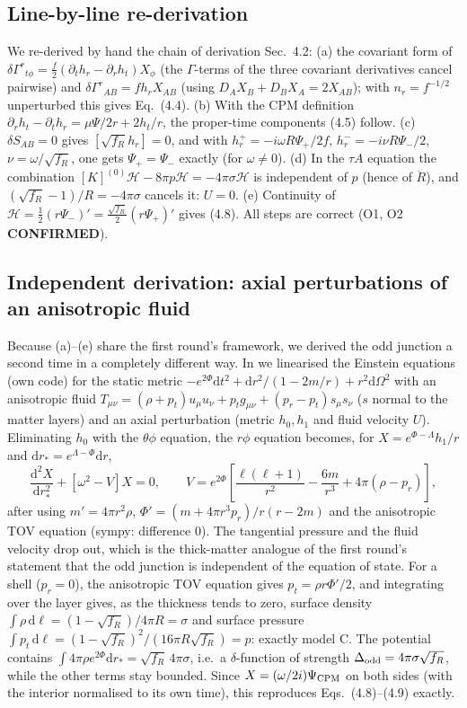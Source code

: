 \documentclass[11pt,a4paper]{article}
\newcommand{\sq}{\sqrt{f_R}}
\newcommand{\dd}{\mathrm{d}}
\newcommand{\OK}{\textcolor{green!50!black}{\textbf{CONFIRMED}}}
\newcommand{\file}[1]{{\small\path{#1}}}
\begin{document}
\subsection{Line-by-line re-derivation}
We re-derived by hand the chain of derivation Sec.~4.2: (a) the covariant form of
$\delta\Gamma^r{}_{t\phi}=\tfrac f2(\partial_th_r-\partial_rh_t)X_\phi$ (the $\Gamma$-terms of the three covariant
derivatives cancel pairwise) and $\delta\Gamma^r{}_{AB}=fh_rX_{AB}$ (using $D_AX_B+D_BX_A=2X_{AB}$); with $n_r=f^{-1/2}$
unperturbed this gives Eq.~(4.4). (b) With the CPM definition $\partial_rh_t-\partial_th_r=\mu\Psi/2r+2h_t/r$, the
proper-time components (4.5) follow. (c) $\delta S_{AB}=0$ gives $[\sq h_r]=0$, and with
$h_r^+=-i\omega R\Psi_+/2f$, $h_r^-=-i\nu R\Psi_-/2$, $\nu=\omega/\sq$, one gets $\Psi_+=\Psi_-$ exactly (for
$\omega\ne0$). (d) In the $\tau A$ equation the combination $[K]^{(0)}\mathcal H-8\pi p\mathcal H=-4\pi\sigma\mathcal H$
is independent of $p$ (hence of $\ddot R$), and $(\sq-1)/R=-4\pi\sigma$ cancels it: $U=0$. (e) Continuity of
$\mathcal H=\tfrac12(r\Psi_-)'=\tfrac{\sq}{2}(r\Psi_+)'$ gives (4.8). All steps are correct (O1, O2 \OK).

\subsection{Independent derivation: axial perturbations of an anisotropic fluid}
Because (a)--(e) share the first round's framework, we derived the odd junction a second time in a completely
different way. In \file{c03_axial_thick_shell_derive.py} we linearised the Einstein equations (own code) for the
static metric $-e^{2\Phi}\dd t^2+\dd r^2/(1-2m/r)+r^2\dd\Omega^2$ with an anisotropic fluid
$T_{\mu\nu}=(\rho+p_t)u_\mu u_\nu+p_tg_{\mu\nu}+(p_r-p_t)s_\mu s_\nu$ ($s$ normal to the matter layers) and an axial
perturbation (metric $h_0,h_1$ and fluid velocity $U$). Eliminating $h_0$ with the $\theta\phi$ equation, the
$r\phi$ equation becomes, for $X=e^{\Phi-\Lambda}h_1/r$ and $\dd r_*=e^{\Lambda-\Phi}\dd r$,
\begin{equation}
\frac{\dd^2X}{\dd r_*^2}+\left[\omega^2-V\right]X=0,\qquad V=e^{2\Phi}\left[\frac{\ell(\ell+1)}{r^2}-\frac{6m}{r^3}+4\pi(\rho-p_r)\right],
\end{equation}
after using $m'=4\pi r^2\rho$, $\Phi'=(m+4\pi r^3p_r)/r(r-2m)$ and the anisotropic TOV equation (sympy: difference 0).
The tangential pressure and the fluid velocity drop out, which is the thick-matter analogue of the first round's
statement that the odd junction is independent of the equation of state. For a shell ($p_r=0$), the
anisotropic TOV equation gives $p_t=\rho r\Phi'/2$, and integrating over the layer gives, as the thickness tends to
zero, surface density $\int\rho\,\dd\ell=(1-\sq)/4\pi R=\sigma$ and surface pressure
$\int p_t\,\dd\ell=(1-\sq)^2/(16\pi R\sq)=p$: exactly model C. The potential contains
$\int4\pi\rho e^{2\Phi}\dd r_*=\sq\,4\pi\sigma$, i.e.\ a $\delta$-function of strength $\Delta_{\rm odd}=4\pi\sigma\sq$,
while the other terms stay bounded. Since $X=(\omega/2i)\Psi_{\rm CPM}$ on both sides (with the interior normalised to
its own time), this reproduces Eqs.~(4.8)--(4.9) exactly.
\end{document}
